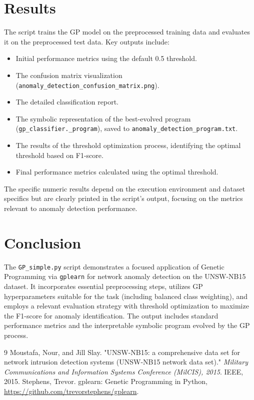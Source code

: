 \documentclass{article}
\begin{document}
\section{Results}
The script trains the GP model on the preprocessed training data and evaluates it on the preprocessed test data. Key outputs include:
\begin{itemize}
    \item Initial performance metrics using the default 0.5 threshold.
    \item The confusion matrix visualization (\texttt{anomaly\_detection\_confusion\_matrix.png}).
    \item The detailed classification report.
    \item The symbolic representation of the best-evolved program (\texttt{gp\_classifier.\_program}), saved to \texttt{anomaly\_detection\_program.txt}.
    \item The results of the threshold optimization process, identifying the optimal threshold based on F1-score.
    \item Final performance metrics calculated using the optimal threshold.
\end{itemize}
The specific numeric results depend on the execution environment and dataset specifics but are clearly printed in the script's output, focusing on the metrics relevant to anomaly detection performance.

\section{Conclusion}
The \texttt{GP\_simple.py} script demonstrates a focused application of Genetic Programming via \texttt{gplearn} for network anomaly detection on the UNSW-NB15 dataset. It incorporates essential preprocessing steps, utilizes GP hyperparameters suitable for the task (including balanced class weighting), and employs a relevant evaluation strategy with threshold optimization to maximize the F1-score for anomaly identification. The output includes standard performance metrics and the interpretable symbolic program evolved by the GP process.

\begin{thebibliography}{9}
     Moustafa, Nour, and Jill Slay. "UNSW-NB15: a comprehensive data set for network intrusion detection systems (UNSW-NB15 network data set)." \textit{Military Communications and Information Systems Conference (MilCIS), 2015}. IEEE, 2015.
     Stephens, Trevor. gplearn: Genetic Programming in Python, \url{https://github.com/trevorstephens/gplearn}.
\end{thebibliography}
\end{document}
